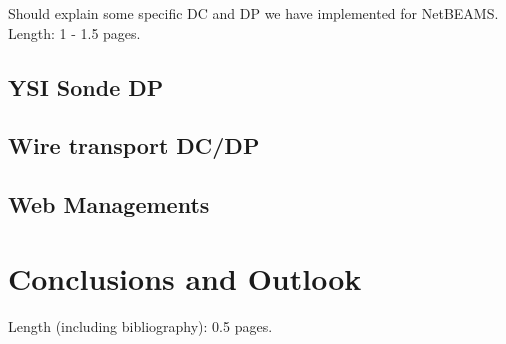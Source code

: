 \documentclass[conference]{IEEEtran}
\begin{document}
Should explain some specific DC and DP we have implemented for
NetBEAMS. Length: 1 - 1.5 pages.

\subsection{YSI Sonde DP}

\subsection{Wire transport DC/DP}

\subsection{Web Managements}


\section{Conclusions and Outlook}

Length (including bibliography): 0.5 pages.

%
%
\end{document}
